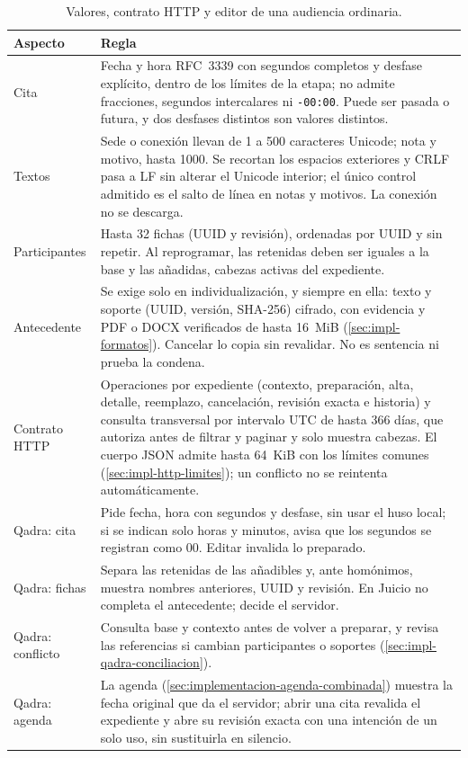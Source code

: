\begin{table}[!t]
  \centering
  \caption{Valores, contrato HTTP y editor de una audiencia ordinaria.}
  \label{tab:impl-audiencias-valores}
  
  \begin{tabularx}{\linewidth}{@{}L{2.65cm} X@{}}
    \toprule
    \textbf{Aspecto} & \textbf{Regla} \\
    \midrule
    Cita & Fecha y hora RFC~3339 con segundos completos y desfase explícito, dentro de los límites de la etapa; no admite fracciones, segundos intercalares ni \texttt{-00:00}. Puede ser pasada o futura, y dos desfases distintos son valores distintos. \\
    Textos & Sede o conexión llevan de 1 a 500 caracteres Unicode; nota y motivo, hasta 1000. Se recortan los espacios exteriores y CRLF pasa a LF sin alterar el Unicode interior; el único control admitido es el salto de línea en notas y motivos. La conexión no se descarga. \\
    Participantes & Hasta 32 fichas (UUID y revisión), ordenadas por UUID y sin repetir. Al reprogramar, las retenidas deben ser iguales a la base y las añadidas, cabezas activas del expediente. \\
    Antecedente & Se exige solo en individualización, y siempre en ella: texto y soporte (UUID, versión, SHA-256) cifrado, con evidencia y PDF o DOCX verificados de hasta 16~MiB (\cref{sec:impl-formatos}). Cancelar lo copia sin revalidar. No es sentencia ni prueba la condena. \\
    \midrule
    Contrato HTTP & Operaciones por expediente (contexto, preparación, alta, detalle, reemplazo, cancelación, revisión exacta e historia) y consulta transversal por intervalo UTC de hasta 366 días, que autoriza antes de filtrar y paginar y solo muestra cabezas. El cuerpo JSON admite hasta 64~KiB con los límites comunes (\cref{sec:impl-http-limites}); un conflicto no se reintenta automáticamente. \\
    \midrule
    Qadra: cita & Pide fecha, hora con segundos y desfase, sin usar el huso local; si se indican solo horas y minutos, avisa que los segundos se registran como 00. Editar invalida lo preparado. \\
    Qadra: fichas & Separa las retenidas de las añadibles y, ante homónimos, muestra nombres anteriores, UUID y revisión. En Juicio no completa el antecedente; decide el servidor. \\
    Qadra: conflicto & Consulta base y contexto antes de volver a preparar, y revisa las referencias si cambian participantes o soportes (\cref{sec:impl-qadra-conciliacion}). \\
    Qadra: agenda & La agenda (\cref{sec:implementacion-agenda-combinada}) muestra la fecha original que da el servidor; abrir una cita revalida el expediente y abre su revisión exacta con una intención de un solo uso, sin sustituirla en silencio. \\
    \bottomrule
  \end{tabularx}
\end{table}

